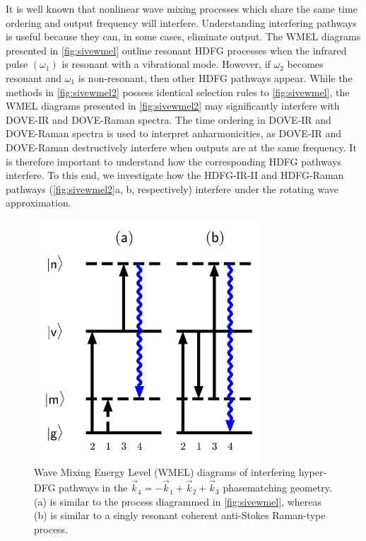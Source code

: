 \documentclass[aip, jcp, reprint, onecolumn]{revtex4-2}
\begin{document}
It is well known that nonlinear wave mixing processes which share the same time ordering and output frequency will interfere. \cite{RN135, Bonn2024}
Understanding interfering pathways is useful because they can, in some cases, eliminate output. \cite{RN342, RN135}
The WMEL diagrams presented in \autoref{fig:sivewmel} outline resonant HDFG processes when the infrared pulse $(\omega_1)$ is resonant with a vibrational mode. 
However, if $\omega_2$ becomes resonant and $\omega_1$ is non-resonant, then other HDFG pathways appear.\cite{McDonnell2024} 
While the methods in \autoref{fig:sivewmel2} possess identical selection rules to \autoref{fig:sivewmel}, the WMEL diagrams presented in \autoref{fig:sivewmel2} may significantly interfere with DOVE-IR and DOVE-Raman spectra.
The time ordering in DOVE-IR and DOVE-Raman spectra is used to interpret anharmonicities, as DOVE-IR and DOVE-Raman destructively interfere when outputs are at the same frequency. \cite{RN135, RN324}
It is therefore important to understand how the corresponding HDFG pathways interfere.
To this end, we investigate how the HDFG-IR-II and HDFG-Raman pathways (\autoref{fig:sivewmel2}a, b, respectively) interfere under the rotating wave approximation. 

\begin{figure}[!htbp]
	\centering
	\includegraphics[width=3.375in]{figures/wmel2.png}
	\caption{Wave Mixing Energy Level (WMEL) diagrams of interfering hyper-DFG pathways in the  $\vec{k}_4 = -\vec{k}_1 + \vec{k}_2 + \vec{k}_3$ phasematching geometry. 
		(a) is similar to the process diagrammed in \autoref{fig:sivewmel}, whereas (b) is similar to a singly resonant coherent anti-Stokes Raman-type process.}
	\label{fig:sivewmel2}
\end{figure}
\end{document}
